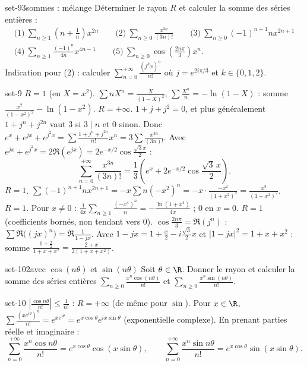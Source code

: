 \begin{exo}{set-9}{3}{sommes : mélange}
Déterminer le rayon $R$ et calculer la somme des séries entières :
\begin{gather*}\text{(1)}\ \sum_{n\geq1}\left(n+\frac1n\right)x^{2n}\qquad\text{(2)}\ \sum_{n\geq0}\frac{x^{3n}}{(3n)!}\qquad\text{(3)}\ \sum_{n\geq0}(-1)^{n+1}nx^{2n+1}\\
\text{(4)}\ \sum_{n\geq1}\frac{(-1)^n}{4n}x^{4n-1}\qquad\text{(5)}\ \sum_{n\geq0}\cos\left(\frac{2n\pi}3\right)x^n.\end{gather*}
Indication pour (2) : calculer $\sum_{n=0}^{+\infty}\frac{(j^kx)^n}{n!}$ où $j=e^{2i\pi/3}$ et $k\in\{0,1,2\}$.
\end{exo}

\begin{corrige}{set-9}
 $R=1$ (en $X=x^2$). $\sum nX^n=\frac X{(1-X)^2}$, $\sum\frac{X^n}n=-\ln(1-X)$ : somme $\frac{x^2}{(1-x^2)^2}-\ln(1-x^2)$.
 $R=+\infty$. $1+j+j^2=0$, et plus généralement $1+j^n+j^{2n}$ vaut $3$ si $3\mid n$ et $0$ sinon. Donc
$e^x+e^{jx}+e^{j^2x}=\sum\frac{1+j^n+j^{2n}}{n!}x^n=3\sum\frac{x^{3n}}{(3n)!}$. Avec $e^{jx}+e^{j^2x}=2\Re(e^{jx})=2e^{-x/2}\cos\frac{\sqrt3x}2$ :
\[\sum_{n=0}^{+\infty}\frac{x^{3n}}{(3n)!}=\frac13\left(e^x+2e^{-x/2}\cos\frac{\sqrt3\,x}2\right).\]
 $R=1$. $\sum(-1)^{n+1}nx^{2n+1}=-x\sum n(-x^2)^n=-x\cdot\frac{-x^2}{(1+x^2)^2}=\frac{x^3}{(1+x^2)^2}$.
 $R=1$. Pour $x\neq0$ : $\frac1{4x}\sum_{n\geq1}\frac{(-x^4)^n}n=-\frac{\ln(1+x^4)}{4x}$ ; $0$ en $x=0$.
 $R=1$ (coefficients bornés, non tendant vers $0$). $\cos\frac{2n\pi}3=\Re(j^n)$ : $\sum\Re\big((jx)^n\big)=\Re\frac1{1-jx}$. Avec
$1-jx=1+\frac x2-i\frac{\sqrt3}2x$ et $|1-jx|^2=1+x+x^2$ : somme $\frac{1+\frac x2}{1+x+x^2}=\frac{2+x}{2(1+x+x^2)}$.
\end{corrige}

\begin{exo}{set-10}{2}{avec $\cos(n\theta)$ et $\sin(n\theta)$}
Soit $\theta\in\R$. Donner le rayon et calculer la somme des séries entières $\displaystyle\sum_{n\geq0}\frac{x^n\cos(n\theta)}{n!}$ et $\displaystyle\sum_{n\geq0}\frac{x^n\sin(n\theta)}{n!}$.
\end{exo}

\begin{corrige}{set-10}
$\left|\frac{\cos n\theta}{n!}\right|\leq\frac1{n!}$ : $R=+\infty$ (de même pour $\sin$). Pour $x\in\R$,
$\sum\frac{(xe^{i\theta})^n}{n!}=e^{xe^{i\theta}}=e^{x\cos\theta}e^{ix\sin\theta}$ (exponentielle complexe). En prenant parties réelle et imaginaire :
\[\sum_{n=0}^{+\infty}\frac{x^n\cos n\theta}{n!}=e^{x\cos\theta}\cos(x\sin\theta),\qquad\sum_{n=0}^{+\infty}\frac{x^n\sin n\theta}{n!}=e^{x\cos\theta}\sin(x\sin\theta).\]
\end{corrige}

